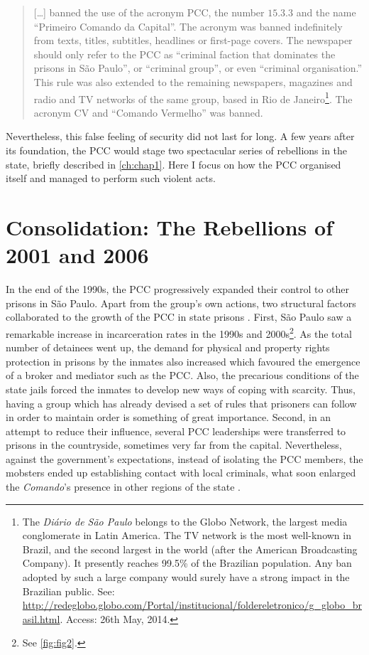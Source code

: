 \begin{quotation}
[\dots] banned the use of the acronym PCC, the number $15.3.3$ and the name ``Primeiro Comando da Capital''. The acronym was banned indefinitely from texts, titles, subtitles, headlines or first-page covers. The newspaper should only refer to the PCC as ``criminal faction that dominates the prisons in S\~{a}o Paulo'', or ``criminal group'', or even ``criminal organisation.'' This rule was also extended to the remaining newspapers, magazines and radio and TV networks of the same group, based in Rio de Janeiro\footnote{The \textit{Di\'{a}rio de S\~{a}o Paulo} belongs to the Globo Network, the largest media conglomerate in Latin America. The TV network is the most well-known in Brazil, and the second largest in the world (after the American Broadcasting Company). It presently reaches 99.5\% of the Brazilian population. Any ban adopted by such a large company would surely have a strong impact in the Brazilian public. See: \href{http://redeglobo.globo.com/Portal/institucional/foldereletronico/ingles/g_globo_brasil.html}{http://redeglobo.globo.com/Portal/institucional/foldereletronico/g\_globo\_brasil.html}. Access:  26th May, 2014.}. The acronym CV and ``Comando Vermelho'' was banned.
\end{quotation}

Nevertheless, this false feeling of security did not last for long. A few years after its foundation, the PCC would stage two spectacular series of rebellions in the state, briefly described in \autoref{ch:chap1}. Here I focus on how the PCC organised itself and managed to perform such violent acts.

\section{Consolidation: The Rebellions of 2001 and 2006}

In the end of the 1990s, the PCC progressively expanded their control to other prisons in S\~{a}o Paulo. Apart from the group's own actions, two structural factors collaborated to the growth of the PCC in state prisons \citep[]{adorno2007organized}. First, S\~{a}o Paulo saw a remarkable increase in incarceration rates in the 1990s and 2000s\footnote{See \autoref{fig:fig2}.}. As the total number of detainees went up, the demand for physical and property rights protection in prisons by the inmates also increased which favoured the emergence of a broker and mediator such as the PCC. Also, the precarious conditions of the state jails forced the inmates to develop new ways of coping with scarcity. Thus, having a group which has already devised a set of rules that prisoners can follow in order to maintain order is something of great importance. Second, in an attempt to reduce their influence, several PCC leaderships were transferred to prisons in the countryside, sometimes very far from the capital. Nevertheless, against the government's expectations, instead of isolating the PCC members, the mobsters ended up establishing contact with local criminals, what soon enlarged the \textit{Comando}'s presence in other regions of the state \citep[103]{dias2011pulverizaccao}. 

